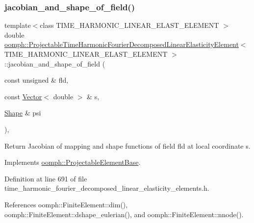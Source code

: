 \subsubsection{\texorpdfstring{jacobian\+\_\+and\+\_\+shape\+\_\+of\+\_\+field()}{jacobian\_and\_shape\_of\_field()}}
{\footnotesize\ttfamily template$<$class T\+I\+M\+E\+\_\+\+H\+A\+R\+M\+O\+N\+I\+C\+\_\+\+L\+I\+N\+E\+A\+R\+\_\+\+E\+L\+A\+S\+T\+\_\+\+E\+L\+E\+M\+E\+NT $>$ \\
double \hyperlink{classoomph_1_1ProjectableTimeHarmonicFourierDecomposedLinearElasticityElement}{oomph\+::\+Projectable\+Time\+Harmonic\+Fourier\+Decomposed\+Linear\+Elasticity\+Element}$<$ T\+I\+M\+E\+\_\+\+H\+A\+R\+M\+O\+N\+I\+C\+\_\+\+L\+I\+N\+E\+A\+R\+\_\+\+E\+L\+A\+S\+T\+\_\+\+E\+L\+E\+M\+E\+NT $>$\+::jacobian\+\_\+and\+\_\+shape\+\_\+of\+\_\+field (\begin{DoxyParamCaption}\item[{const unsigned \&}]{fld,  }\item[{const \hyperlink{classoomph_1_1Vector}{Vector}$<$ double $>$ \&}]{s,  }\item[{\hyperlink{classoomph_1_1Shape}{Shape} \&}]{psi }\end{DoxyParamCaption})\hspace{0.3cm}{\ttfamily [inline]}, {\ttfamily [virtual]}}



Return Jacobian of mapping and shape functions of field fld at local coordinate s. 



Implements \hyperlink{classoomph_1_1ProjectableElementBase_ad45c21b58c0985d52f68ab2d79cbb488}{oomph\+::\+Projectable\+Element\+Base}.



Definition at line 691 of file time\+\_\+harmonic\+\_\+fourier\+\_\+decomposed\+\_\+linear\+\_\+elasticity\+\_\+elements.\+h.



References oomph\+::\+Finite\+Element\+::dim(), oomph\+::\+Finite\+Element\+::dshape\+\_\+eulerian(), and oomph\+::\+Finite\+Element\+::nnode().

\mbox{\label{classoomph_1_1ProjectableTimeHarmonicFourierDecomposedLinearElasticityElement_aba8a4c3e1fdaed3fa059c55d7c021ff5}} 
